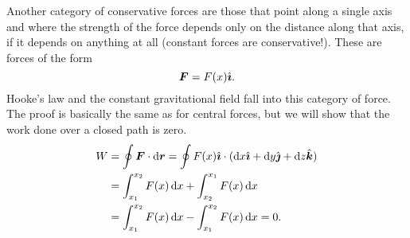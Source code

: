 \documentclass[../classical_mechanics.tex]{subfiles}
\begin{document}
        Another category of conservative forces are those that point along a single axis and where the strength of the force depends only on the distance along that axis, if it depends on anything at all (constant forces are conservative!).
        These are forces of the form
        \begin{equation}
            \boldsymbol{F}=F(x)\hat{\boldsymbol{\imath}}.
        \end{equation}
        Hooke's law and the constant gravitational field fall into this category of force.
        The proof is basically the same as for central forces, but we will show that the work done over a closed path is zero.
        \begin{align}
            W&=\oint\vec{F}\cdot\dd{\vec{r}}=\oint F(x)\ihat\cdot(\dd{x}\ihat+\dd{y}\jhat+\dd{z}\khat)\\
            &=\int_{x_1}^{x_2}F(x)\dd{x}+\int_{x_2}^{x_1}F(x)\dd{x}\\
            &=\int_{x_1}^{x_2}F(x)\dd{x}-\int_{x_1}^{x_2}F(x)\dd{x}=0.
        \end{align}

\end{document}
